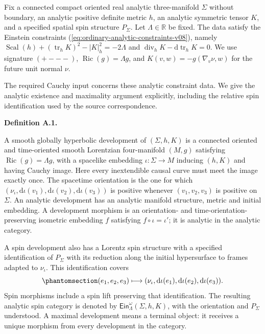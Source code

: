 \documentclass[
  english,
  11pt,
  reqno]{amsart}
\makeatletter
\newcommand{\pandocstatementheading}[1]{%
  \par\addpenalty{\@beginparpenalty}%
  \addvspace{.5\baselineskip plus .2\baselineskip minus .2\baselineskip}%
  {\normalfont\bfseries #1\par}%
  \nobreak\@afterindenttrue\@afterheading
}
\makeatother
\begin{document}
Fix a connected compact oriented real analytic three-manifold \(\Sigma\)
without boundary, an analytic positive definite metric \(h\), an
analytic symmetric tensor \(K\), and a specified spatial spin structure
\(P_\Sigma\). Let \(\Lambda\in\mathbb R\) be fixed. The data satisfy the
Einstein constraints (\ref{eq:ordinary-analytic-constraints-v08}),
namely
\(\operatorname{Scal}(h)+(\operatorname{tr}_hK)^2-|K|_h^2=-2\Lambda\)
and \(\operatorname{div}_hK-\mathrm d\operatorname{tr}_hK=0\). We use
signature \((+---)\), \(\operatorname{Ric}(g)=\Lambda g\), and
\(K(v,w)=-g(\nabla_v\nu,w)\) for the future unit normal \(\nu\).

The required Cauchy input concerns these analytic constraint data. We
give the analytic existence and maximality argument explicitly,
including the relative spin identification used by the source
correspondence.

\pandocstatementheading{\protect{}\label{def:analytic-ghd-v2}Definition A.1.}

A smooth globally hyperbolic development of \((\Sigma,h,K)\) is a
connected oriented and time-oriented smooth Lorentzian four-manifold
\((M,g)\) satisfying \(\operatorname{Ric}(g)=\Lambda g\), with a
spacelike embedding \(\iota:\Sigma\to M\) inducing \((h,K)\) and having
Cauchy image. Here every inextendible causal curve must meet the image
exactly once. The spacetime orientation is the one for which
\((\nu_\iota,\mathrm d\iota(v_1),\mathrm d\iota(v_2),\mathrm d\iota(v_3))\)
is positive whenever \((v_1,v_2,v_3)\) is positive on \(\Sigma\). An
analytic development has an analytic manifold structure, metric and
initial embedding. A development morphism is an orientation- and
time-orientation-preserving isometric embedding \(f\) satisfying
\(f\circ\iota=\iota'\); it is analytic in the analytic category.

A spin development also has a Lorentz spin structure with a specified
identification of \(P_\Sigma\) with its reduction along the initial
hypersurface to frames adapted to \(\nu_\iota\). This identification
covers
\begin{equation}\protect\phantomsection\label{eq:initial-adapted-frame-identification}{
(e_1,e_2,e_3)\longmapsto
(\nu_\iota,\mathrm d\iota(e_1),\mathrm d\iota(e_2),\mathrm d\iota(e_3)).
}\end{equation} Spin morphisms include a spin lift preserving that
identification. The resulting analytic spin category is denoted by
\(\mathsf{Ein}^{\omega}_\Lambda(\Sigma,h,K)\), with the orientation and
\(P_\Sigma\) understood. A maximal development means a terminal object:
it receives a unique morphism from every development in the category.
\end{document}
